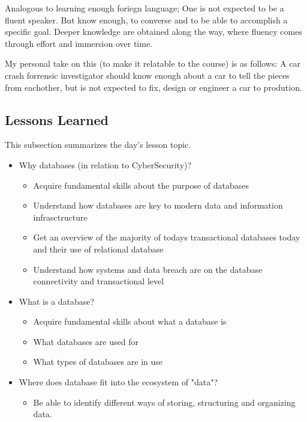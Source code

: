 {Analogous to learning enough foriegn language; One is not expected to be a fluent speaker. But know enough, to converse and to be able to accomplish a specific goal. Deeper knowledge are obtained along the way, where fluency comes through effort and immersion over time. 

My personal take on this (to make it relatable to the course) is as follows: A car crash forrensic investigator should know enough about a car to tell the pieces from eachother, but is not expected to fix, design or engineer a car to prodution.



\subsection{Lessons Learned}

This subsection summarizes the day's lesson topic.

\begin{itemize}
    \item Why databases (in relation to CyberSecurity)?
        \begin{itemize}
            \item Acquire fundamental skills about the purpose of databases
            \item Understand how databases are key to modern data and information infrasctructure
            \item Get an overview of the majority of todays transactional databases today and their use of relational database
            \item Understand how systems and data breach are on the database connectivity and transactional level
        \end{itemize}
    \item What is a database?
        \begin{itemize}
            \item Acquire fundamental skills about what a database is
            \item What databases are used for
            \item What types of databases are in use
        \end{itemize}
    \item Where does database fit into the ecosystem of "data"?
        \begin{itemize}
            \item Be able to identify different ways of storing, structuring and organizing data.
        \end{itemize}
\end{itemize}


}
